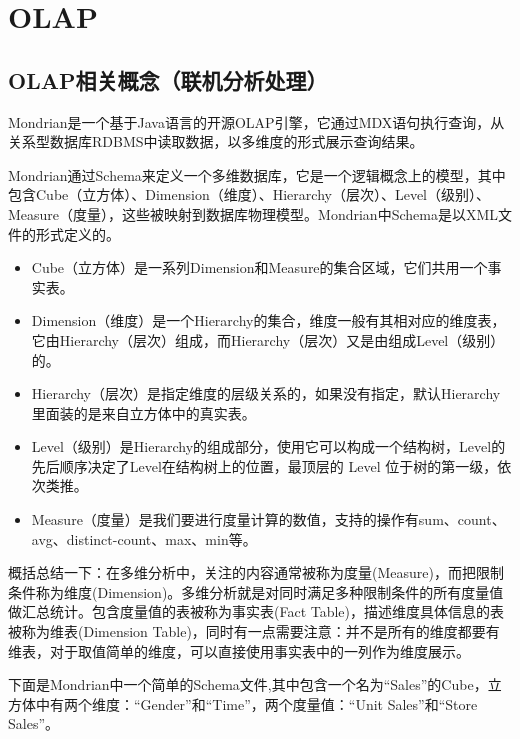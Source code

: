 \section{OLAP}
\subsection{OLAP相关概念（联机分析处理）}
Mondrian是一个基于Java语言的开源OLAP引擎，它通过MDX语句执行查询，从关系型数据库RDBMS中读取数据，以多维度的形式展示查询结果。
\par Mondrian通过Schema来定义一个多维数据库，它是一个逻辑概念上的模型，其中包含Cube（立方体）、Dimension（维度）、Hierarchy（层次）、Level（级别）、Measure（度量），这些被映射到数据库物理模型。Mondrian中Schema是以XML文件的形式定义的。
\begin{itemize}
\item Cube（立方体）是一系列Dimension和Measure的集合区域，它们共用一个事实表。
\item Dimension（维度）是一个Hierarchy的集合，维度一般有其相对应的维度表，它由Hierarchy（层次）组成，而Hierarchy（层次）又是由组成Level（级别）的。
\item Hierarchy（层次）是指定维度的层级关系的，如果没有指定，默认Hierarchy里面装的是来自立方体中的真实表。
\item Level（级别）是Hierarchy的组成部分，使用它可以构成一个结构树，Level的先后顺序决定了Level在结构树上的位置，最顶层的 Level 位于树的第一级，依次类推。
\item Measure（度量）是我们要进行度量计算的数值，支持的操作有sum、count、avg、distinct-count、max、min等。
\end{itemize}
\par 概括总结一下：在多维分析中，关注的内容通常被称为度量(Measure)，而把限制条件称为维度(Dimension)。多维分析就是对同时满足多种限制条件的所有度量值做汇总统计。包含度量值的表被称为事实表(Fact Table)，描述维度具体信息的表被称为维表(Dimension Table)，同时有一点需要注意：并不是所有的维度都要有维表，对于取值简单的维度，可以直接使用事实表中的一列作为维度展示。
\par 下面是Mondrian中一个简单的Schema文件,其中包含一个名为“Sales”的Cube，立方体中有两个维度：“Gender”和“Time”，两个度量值：“Unit Sales”和“Store Sales”。
